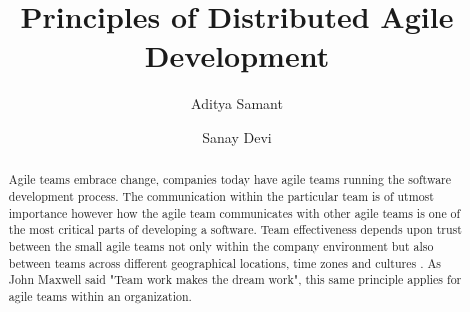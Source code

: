 \documentclass[sigconf]{acmart}
\begin{document}
%
\title{Principles of Distributed Agile Development}

%
\author{Aditya Samant}

\author{Sanay Devi}


%
\begin{abstract}

Agile teams embrace change, companies today have agile teams running the software development process. The communication within the particular team is of utmost importance however how the agile team communicates with other agile teams is one of the most critical parts of developing a software. Team effectiveness depends upon trust between the small agile teams not only within the company environment but also between teams across different geographical locations, time zones and cultures \cite{Siva13}. As John Maxwell said "Team work makes the dream work", this same principle applies for agile teams within an organization. 

\end{abstract}

%

%

%
\maketitle
\end{document}

